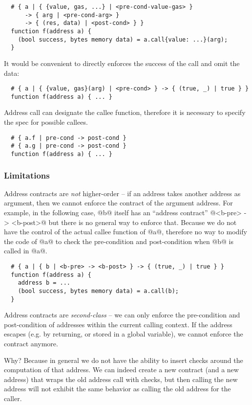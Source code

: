 \documentclass[acmsmall,review,anonymous]{acmart}\settopmatter{printfolios=true,printccs=false,printacmref=false}
\begin{document}
\begin{lstlisting}
  # { a | { {value, gas, ...} | <pre-cond-value-gas> }
      -> { arg | <pre-cond-arg> }
      -> { (res, data) | <post-cond> } }
  function f(address a) {
    (bool success, bytes memory data) = a.call{value: ...}(arg);
  }
\end{lstlisting}

It would be convenient to directly enforces the success of the call and omit
the data:
\begin{lstlisting}
  # { a | { {value, gas}(arg) | <pre-cond> } -> { (true, _) | true } }
  function f(address a) { ... }
\end{lstlisting}

Address call can designate the callee function, therefore it is necessary to
specify the spec for possible callees.

\begin{lstlisting}
  # { a.f | pre-cond -> post-cond }
  # { a.g | pre-cond -> post-cond }
  function f(address a) { ... }
\end{lstlisting}

\subsubsection*{Limitations}
Address contracts are \emph{not} higher-order -- if an address takes another
address as argument, then we cannot enforce the contract of the argument
address.
For example, in the following case, @b@ itself has an ``address contract''
@<b-pre> -> <b-post>@ but there is no general way to enforce that.
Because we do not have the control of the actual callee function of @a@,
therefore no way to modify the code of @a@ to check the pre-condition
and post-condition when @b@ is called in @a@.

\begin{lstlisting}
  # { a | { b | <b-pre> -> <b-post> } -> { (true, _) | true } }
  function f(address a) {
    address b = ...
    (bool success, bytes memory data) = a.call(b);
  }
\end{lstlisting}

Address contracts are \emph{second-class} -- we can only enforce the
pre-condition and post-condition of addresses within the current calling
context.  If the address escapes (e.g. by returning, or stored in a global
variable), we cannot enforce the contract anymore.

Why? Because in general we do not have the ability to insert checks around the
computation of that address. We can indeed create a new contract (and a new address) that wraps the old address call with checks, but then calling
the new address will not exhibit the same behavior as calling the old address
for the caller.
\end{document}
